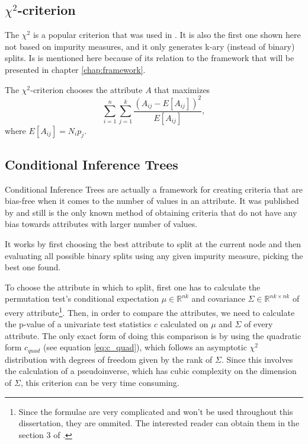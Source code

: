 \subsection{$\chi^2$-criterion}
The $\chi^2$ is a popular criterion that was  used in \cite{Mingers.87}. It is also the first one shown here not based on impurity measures, and it only generates k-ary (instead of binary) splits. Is is mentioned here because of its relation to the framework that will be presented in chapter \ref{chap:framework}.

The $\chi^2$-criterion chooses the attribute $A$ that maximizes
\begin{equation}
\label{eq:chitest}
\sum_{i=1}^n \sum_{j=1}^k \frac{(A_{ij}-E[A_{ij}] )^2}{E[A_{ij}]},
\end{equation}
where $E[A_{ij}]=N_i p_j$.

\subsection{Conditional Inference Trees}
Conditional Inference Trees are actually a framework for creating criteria that are bias-free when it comes to the number of values in an attribute. It was published by \cite{Hothorn:2006:URP} and still is the only known method of obtaining criteria that do not have any bias towards attributes with larger number of values.

It works by first choosing the best attribute to split at the current node and then evaluating all possible binary splits using any given impurity measure, picking the best one found.

To choose the attribute in which to split, first one has to calculate the permutation test's conditional expectation $\mu \in \mathbb{R}^{nk}$ and covariance $\Sigma \in \mathbb{R}^{nk\times nk}$ of every attribute\footnote{Since the formulae are very complicated and won't be used throughout this dissertation, they are ommited. The interested reader can obtain them in the section 3 of  \cite{Hothorn:2006:URP}.}. Then, in order to compare the attributes, we need to calculate the p-value of a univariate test statistics $c$ calculated on $\mu$ and $\Sigma$ of every attribute. The only exact form of doing this comparison is by using the quadratic form $c_{quad}$ (see equation \ref{eq:c_quad}), which follows an asymptotic $\chi^2$ distribution with degrees of freedom given by the rank of $\Sigma$. Since this involves the calculation of a pseudoinverse, which has cubic complexity on the dimension of $\Sigma$, this criterion can be very time consuming.

